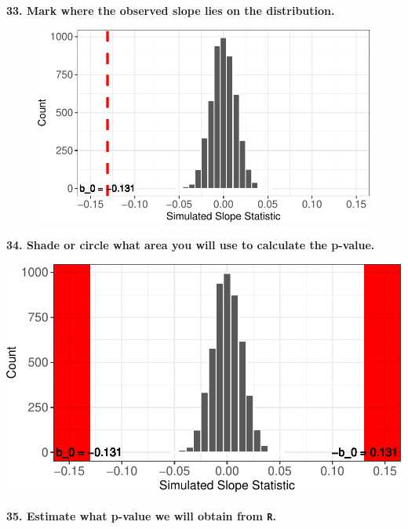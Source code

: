 \documentclass[
  letterpaper,
  DIV=11,
  numbers=noendperiod]{scrartcl}
\begin{document}

\vspace{1in}

\textbf{33. Mark where the observed slope lies on the distribution.}

\begin{figure}

{\centering \includegraphics{activity4-diving-penguins-key_files/figure-pdf/null-viz2-1.pdf}

}

\end{figure}

\textbf{34. Shade or circle what area you will use to calculate the
p-value.}

\includegraphics{activity4-diving-penguins-key_files/figure-pdf/unnamed-chunk-1-1.pdf}

\textbf{35. Estimate what p-value we will obtain from \texttt{R}.}
\end{document}
